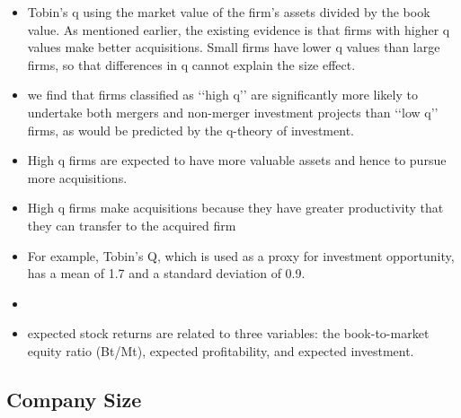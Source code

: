 \documentclass[12pt]{article}
\begin{document}
    \begin{itemize}
        \item Tobin’s q using the market value of the firm’s assets divided by the book value. As mentioned earlier, the existing evidence is that firms with higher q values make better acquisitions. Small firms have lower q values than large firms, so that differences in q cannot explain the size effect. \citep{Moeller2004}

        \item we find that firms classified as ‘‘high q’’ are significantly more likely to undertake both mergers and non-merger investment projects than ‘‘low q’’ firms, as would be predicted by the q-theory of investment. 

        \item High q firms are expected to have more valuable assets and hence to pursue more acquisitions. \citep{Arikan2016}

        \item High q firms make acquisitions because they have greater productivity that they can transfer to the acquired firm \citep{Arikan2016}

        \item For example, Tobin’s Q, which is used as a proxy for investment opportunity, has a mean of 1.7 and a standard deviation of 0.9.\citep{DUCHIN2010}

        \item  \item expected stock returns are related to three variables: the book-to-market equity ratio (Bt/Mt), expected profitability, and expected investment.\citep{Fama2006}

    \end{itemize}

\subsection{Company Size}
\end{document}

